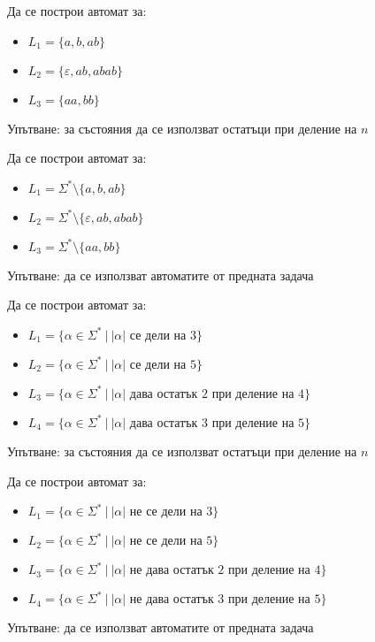 \begin{problem}
Да се построи автомат за:
\begin{itemize}
    \item $L_1 = \{ a, b, ab \}$
    \item $L_2 = \{ \varepsilon, ab, abab \}$
    \item $L_3 = \{ aa, bb \}$
\end{itemize}
Упътване: за състояния да се използват остатъци при деление на $n$
\end{problem}

\begin{problem}
Да се построи автомат за:
\begin{itemize}
    \item $L_1 = \Sigma^* \setminus \{ a, b, ab \}$
    \item $L_2 = \Sigma^* \setminus \{ \varepsilon, ab, abab \}$
    \item $L_3 = \Sigma^* \setminus \{ aa, bb \}$
\end{itemize}
Упътване: да се използват автоматите от предната задача
\end{problem}

\begin{problem}
Да се построи автомат за:
\begin{itemize}
    \item $L_1 = \{ \alpha \in \Sigma^* \: | \: |\alpha| \text{ се дели на } 3 \}$
    \item $L_2 = \{ \alpha \in \Sigma^* \: | \: |\alpha| \text{ се дели на } 5 \}$
    \item $L_3 = \{ \alpha \in \Sigma^* \: | \: |\alpha| \text{ дава остатък } 2 \text{ при деление на } 4 \}$
    \item $L_4 = \{ \alpha \in \Sigma^* \: | \: |\alpha| \text{ дава остатък } 3 \text{ при деление на } 5 \}$
\end{itemize}
Упътване: за състояния да се използват остатъци при деление на $n$
\end{problem}

\begin{problem}
Да се построи автомат за:
\begin{itemize}
    \item $L_1 = \{ \alpha \in \Sigma^* \: | \: |\alpha| \text{ не се дели на } 3 \}$
    \item $L_2 = \{ \alpha \in \Sigma^* \: | \: |\alpha| \text{ не се дели на } 5 \}$
    \item $L_3 = \{ \alpha \in \Sigma^* \: | \: |\alpha| \text{ не дава остатък } 2 \text{ при деление на } 4 \}$
    \item $L_4 = \{ \alpha \in \Sigma^* \: | \: |\alpha| \text{ не дава остатък } 3 \text{ при деление на } 5 \}$
\end{itemize}
Упътване: да се използват автоматите от предната задача
\end{problem}